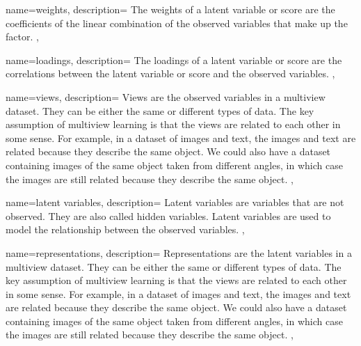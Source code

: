  {
    name={weights},
    description={
        The weights of a latent variable or score are the coefficients of the linear combination of the observed variables that make up the factor.
    },
}

 {
    name={loadings},
    description={
        The loadings of a latent variable or score are the correlations between the latent variable or score and the observed variables.
    },
}

 {
    name={views},
    description={
        Views are the observed variables in a multiview dataset.
        They can be either the same or different types of data.
        The key assumption of multiview learning is that the views are related to each other in some sense.
        For example, in a dataset of images and text, the images and text are related because they describe the same object.
        We could also have a dataset containing images of the same object taken from different angles, in which case the images are still related because they describe the same object.
    },
}

 {
    name={latent variables},
    description={
        Latent variables are variables that are not observed.
        They are also called hidden variables.
        Latent variables are used to model the relationship between the observed variables.
    },
}

 {
    name={representations},
    description={
        Representations are the latent variables in a multiview dataset.
        They can be either the same or different types of data.
        The key assumption of multiview learning is that the views are related to each other in some sense.
        For example, in a dataset of images and text, the images and text are related because they describe the same object.
        We could also have a dataset containing images of the same object taken from different angles, in which case the images are still related because they describe the same object.
    },
}